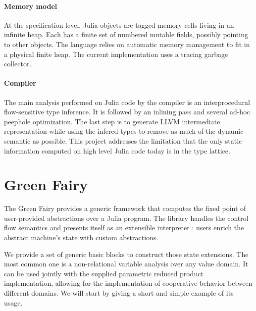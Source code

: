 \documentclass[11pt]{article}
\begin{document}
\paragraph{Memory model} At the specification level, Julia objects are tagged memory cells living in an infinite heap. Each has a finite set of numbered mutable fields, possibly pointing to other objects. The language relies on automatic memory management to fit in a physical finite heap.
The current implementation uses a tracing garbage collector.

\paragraph{Compiler} The main analysis performed on Julia code by the compiler is an interprocedural flow-sensitive type inference. It is followed by an inlining pass and several ad-hoc peephole optimization. The last step is to generate LLVM intermediate representation while using the infered types to remove as much of the dynamic semantic as possible.
This project addresses the limitation that the only static information computed on high level Julia code today is in the type lattice.


\section*{Green Fairy}

The Green Fairy provides a generic framework that computes the fixed point of user-provided abstractions over a Julia program.
The library handles the control flow semantics and presents itself as an extensible interpreter : users enrich the abstract machine's state with custom abstractions.

We provide a set of generic basic blocks to construct those state extensions.
The most common one is a non-relational variable analysis over any value domain.
It can be used jointly with the supplied parametric reduced product\cite{redprod} implementation, allowing for the implementation of cooperative behavior between different domains.
We will start by giving a short and simple example of its usage.
\end{document}
